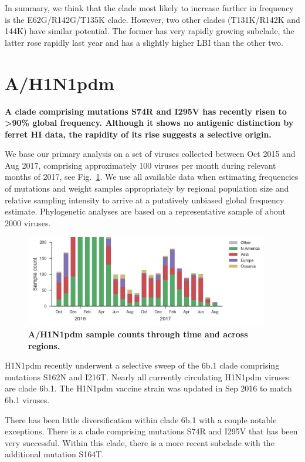 \documentclass[11pt,oneside,letterpaper]{article}
\newcommand{\FIG}[1]{Fig.~\ref{#1}}
\begin{document}
In summary, we think that the clade most likely to increase further in
frequency is the E62G/R142G/T135K clade. However, two other clades
(T131K/R142K and 144K) have similar potential. The former has very
rapidly growing subclade, the latter rose rapidly last year and has a
slightly higher LBI than the other two.


\clearpage
\section*{A/H1N1pdm}

\textbf{A clade comprising mutations S74R and I295V has recently risen
to \textgreater{}90\% global frequency. Although it shows no antigenic
distinction by ferret HI data, the rapidity of its rise suggests a
selective origin.}

We base our primary analysis on a set of viruses collected between Oct
2015 and Aug 2017, comprising approximately 100 viruses per month during
relevant months of 2017, see \FIG{H1N1pdm_counts}. We use all available data when estimating
frequencies of mutations and weight samples appropriately by regional
population size and relative sampling intensity to arrive at a
putatively unbiased global frequency estimate. Phylogenetic analyses are
based on a representative sample of about 2000 viruses.

\begin{figure}[H]
  \centering
  \includegraphics[width=0.95\textwidth]{../figures/sep-2017/h1n1pdm_counts.png}
  \caption{\textbf{A/H1N1pdm sample counts through time and across regions.}}
  \label{H1N1pdm_counts}
\end{figure}

H1N1pdm recently underwent a selective sweep of the 6b.1 clade
comprising mutations S162N and I216T. Nearly all currently circulating
H1N1pdm viruses are clade 6b.1. The H1N1pdm vaccine strain was updated
in Sep 2016 to match 6b.1 viruses.

There has been little diversification within clade 6b.1 with a couple
notable exceptions. There is a clade comprising mutations S74R and I295V
that has been very successful. Within this clade, there is a more recent
subclade with the additional mutation S164T.
\end{document}
